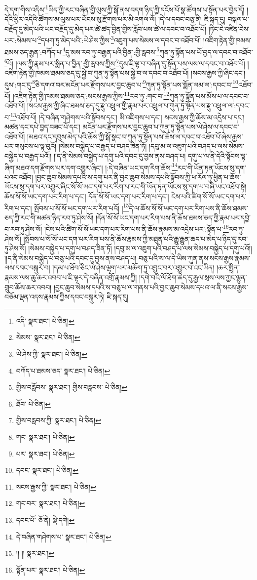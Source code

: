 དེ་དག་གིས་འདིས་\footnote{འདི་  སྣར་ཐང་།  པེ་ཅིན། }ཡིད་ཀྱི་རང་བཞིན་གྱི་ལུས་ཀྱི་སྒོ་ནས་བདག་ཉིད་ཀྱི་དངོས་པོ་སྣ་ཚོགས་པ་སྟོན་པར་བྱེད་དོ། །དེའི་ཕྱིར་འདིའི་ཚོགས་མ་ལུས་པར་ཡོངས་སུ་རྫོགས་པར་མི་འགལ་ལོ། །དེ་ལ་དབང་བཅུ་ནི། ཇི་སྐད་དུ། བསྐལ་པ་བརྗོད་དུ་མེད་པའི་ཡང་བརྗོད་དུ་མེད་པར་ཚེ་ཚད་བྱིན་གྱིས་རློབ་པས་ཚེ་ལ་དབང་བ་འཐོབ་པོ། །ཏིང་ངེ་འཛིན་ངེས་པར་:སེམས་པ་\footnote{སེམས་  སྣར་ཐང་།  པེ་ཅིན། }དཔག་ཏུ་མེད་པའི་:ཡེ་ཤེས་ཀྱིས་\footnote{ཡེ་ཤེས་ཀྱི་  སྣར་ཐང་།  པེ་ཅིན། }འཇུག་པས་སེམས་ལ་དབང་བ་འཐོབ་པོ། །འཇིག་རྟེན་གྱི་ཁམས་ཐམས་ཅད་རྒྱན་:བཀོད་པ་\footnote{བཀོད་པ་ཐམས་ཅད་  སྣར་ཐང་།  པེ་ཅིན། }དུ་མས་རབ་ཏུ་བརྒྱན་པའི་བྱིན་:གྱི་རླབས་\footnote{གྱིས་བརློབས་  སྣར་ཐང་། གྱིས་བརླབས་  པེ་ཅིན། }ཀུན་ཏུ་སྟོན་པས་ཡོ་བྱད་ལ་དབང་བ་འཐོབ་\footnote{ཐོབ་  པེ་ཅིན། }པོ། །ལས་ཀྱི་རྣམ་པར་སྨིན་པ་བྱིན་:གྱི་རླབས་ཀྱིས་\footnote{གྱིས་བརླབས་ཀྱི་  སྣར་ཐང་།  པེ་ཅིན། }དུས་ཇི་ལྟ་བ་བཞིན་དུ་སྟོན་པས་ལས་ལ་དབང་བ་འཐོབ་པོ། །འཇིག་རྟེན་གྱི་ཁམས་ཐམས་ཅད་དུ་སྐྱེ་བ་ཀུན་ཏུ་སྟོན་པས་སྐྱེ་བ་ལ་དབང་བ་འཐོབ་པོ། །སངས་རྒྱས་ཀྱི་ཞིང་དང་། དུས་:གང་དུ་\footnote{གང་  སྣར་ཐང་།  པེ་ཅིན། }ཅི་དགའ་བར་མངོན་པར་རྫོགས་པར་བྱང་ཆུབ་པ་\footnote{པར་  སྣར་ཐང་།  པེ་ཅིན། }ཀུན་ཏུ་སྟོན་པས་སྨོན་ལམ་ལ་:དབང་བ་\footnote{དབང་  སྣར་ཐང་།  པེ་ཅིན། }འཐོབ་པོ། །འཇིག་རྟེན་གྱི་ཁམས་ཐམས་ཅད་:སངས་རྒྱས་ཀྱིས་\footnote{སངས་རྒྱས་ཀྱི་  སྣར་ཐང་།  པེ་ཅིན། }རབ་ཏུ་:གང་བ་\footnote{གང་བར་  སྣར་ཐང་།  པེ་ཅིན། }ཀུན་ཏུ་སྟོན་པས་མོས་པ་ལ་དབང་བ་འཐོབ་པོ། །སངས་རྒྱས་ཀྱི་ཞིང་ཐམས་ཅད་དུ་རྫུ་འཕྲུལ་གྱི་རྣམ་པར་འཕྲུལ་པ་ཀུན་ཏུ་སྟོན་པས་རྫུ་འཕྲུལ་ལ་:དབང་བ་\footnote{དབང་པོ་  ཅོ་ནེ།  སྡེ་དགེ། }འཐོབ་པོ། །དེ་བཞིན་གཤེགས་པའི་སྟོབས་དང་། མི་འཇིགས་པ་དང་། སངས་རྒྱས་ཀྱི་ཆོས་མ་འདྲེས་པ་དང་། མཚན་དང་དཔེ་བྱད་བཟང་པོ་དང་། མངོན་པར་རྫོགས་པར་བྱང་ཆུབ་པ་ཀུན་ཏུ་སྟོན་པས་ཡེ་ཤེས་ལ་དབང་བ་འཐོབ་པོ། །མཐའ་དང་དབུས་མེད་པའི་ཆོས་ཀྱི་སྒོ་སྣང་བ་ཀུན་ཏུ་སྟོན་པས་ཆོས་ལ་དབང་བ་འཐོབ་པོ་ཞེས་རྒྱས་པར་གསུངས་པ་ལྟ་བུའོ། །སེམས་བསྐྱེད་པ་བརྒྱད་པ་བཤད་ཟིན་ཏོ། །དབུ་མ་ལ་འཇུག་པའི་བཤད་པ་ལས་སེམས་བསྐྱེད་པ་བརྒྱད་པའོ།། །།ད་ནི་སེམས་བསྐྱེད་པ་དགུ་པའི་དབང་དུ་བྱས་ནས་བཤད་པ། དགུ་པ་ལ་ནི་དེའི་སྟོབས་ལྟ་ཞིག་མཐའ་དག་རྫོགས་པར་དག་འགྱུར་ཞིང་། །:དེ་བཞིན་ཡང་དག་རིག་ཆོས་\footnote{དེ་བཞིན་གཤེགས་པ་  སྣར་ཐང་།  པེ་ཅིན། }རང་གི་ཡོན་ཏན་ཡོངས་སུ་དག་པའང་འཐོབ། །བྱང་ཆུབ་སེམས་དཔའི་ས་དགུ་པར་ནི་བྱང་ཆུབ་སེམས་དཔའི་སྟོབས་ཀྱི་ཕ་རོལ་ཏུ་ཕྱིན་པ་ཆོས་ཡོངས་སུ་དག་པར་འགྱུར་ཞིང་སོ་སོ་ཡང་དག་པར་རིག་པ་རང་གི་ཡོན་ཏན་ཡོངས་སུ་དག་པ་བཞི་ཡང་འཐོབ་སྟེ། ཆོས་སོ་སོ་ཡང་དག་པར་རིག་པ་དང་། དོན་སོ་སོ་ཡང་དག་པར་རིག་པ་དང་། ངེས་པའི་ཚིག་སོ་སོ་ཡང་དག་པར་རིག་པ་དང་། སྤོབས་པ་སོ་སོ་ཡང་དག་པར་རིག་པའོ། །\footnote{།། །།  སྣར་ཐང་། }དེ་ལ་ཆོས་སོ་སོ་ཡང་དག་པར་རིག་པས་ནི་ཆོས་ཐམས་ཅད་ཀྱི་རང་གི་མཚན་ཉིད་རབ་ཏུ་ཤེས་སོ། །དོན་སོ་སོ་ཡང་དག་པར་རིག་པས་ནི་ཆོས་ཐམས་ཅད་ཀྱི་རྣམ་པར་དབྱེ་བ་རབ་ཏུ་ཤེས་སོ། །ངེས་པའི་ཚིག་སོ་སོ་ཡང་དག་པར་རིག་པས་ནི་ཆོས་རྣམས་མ་འདྲེས་པར་:སྟོན་པ་\footnote{སྟོན་པར་  སྣར་ཐང་།  པེ་ཅིན། }རབ་ཏུ་ཤེས་སོ། །སྤོབས་པ་སོ་སོ་ཡང་དག་པར་རིག་པས་ནི་ཆོས་རྣམས་ཀྱི་མཐུན་པའི་རྒྱུ་རྒྱུན་ཆད་པ་མེད་པ་ཉིད་དུ་རབ་ཏུ་ཤེས་སོ། །སེམས་བསྐྱེད་པ་དགུ་པ་བཤད་ཟིན་ཏོ། །དབུ་མ་ལ་འཇུག་པའི་བཤད་པ་ལས་སེམས་བསྐྱེད་པ་དགུ་པའོ།། །།ད་ནི་སེམས་བསྐྱེད་པ་བཅུ་པའི་དབང་དུ་བྱས་ནས་བཤད་པ། བཅུ་པའི་ས་ལ་དེ་ཡིས་ཀུན་ནས་སངས་རྒྱས་རྣམས་ལས་དབང་བསྐུར་བ། །དམ་པ་ཐོབ་ཅིང་ཡེ་ཤེས་ལྷག་པར་མཆོག་ཏུ་འབྱུང་བར་འགྱུར་བ་འང་ཡིན། །ཆར་སྤྲིན་རྣམས་ལས་ཆུ་ཆར་འབབ་པ་ཇི་ལྟར་དེ་བཞིན་འགྲོ་རྣམས་ཀྱི། །དགེ་བའི་ལོ་ཐོག་ཆེད་དུ་རྒྱལ་སྲས་ལས་ཀྱང་ལྷུན་གྲུབ་ཆོས་ཆར་འབབ། །བྱང་ཆུབ་སེམས་དཔའི་ས་བཅུ་པ་ལ་གནས་པའི་བྱང་ཆུབ་སེམས་དཔའ་ལ་ནི་སངས་རྒྱས་བཅོམ་ལྡན་འདས་རྣམས་ཀྱིས་དབང་བསྐུར་ཏེ། ཇི་སྐད་དུ། 